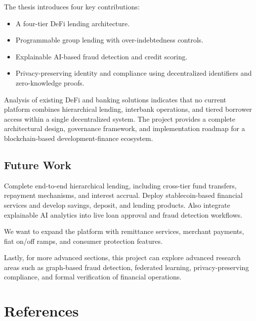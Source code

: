 \documentclass[12pt, a4paper]{report}
\begin{document}
The thesis introduces four key contributions:
\begin{itemize}[noitemsep]
\item A four-tier DeFi lending architecture.
\item Programmable group lending with over-indebtedness controls.
\item Explainable AI-based fraud detection and credit scoring.
\item Privacy-preserving identity and compliance using decentralized identifiers and zero-knowledge proofs.
\end{itemize}

Analysis of existing DeFi and banking solutions indicates that no current platform combines hierarchical lending, interbank operations, and tiered borrower access within a single decentralized system. The project provides a complete architectural design, governance framework, and implementation roadmap for a blockchain-based development-finance ecosystem.

\section{Future Work}

Complete end-to-end hierarchical lending, including cross-tier fund transfers, repayment mechanisms, and interest accrual. Deploy stablecoin-based financial services and develop savings, deposit, and lending products. Also integrate explainable AI analytics into live loan approval and fraud detection workflows.

We want to expand the platform with remittance services, merchant payments, fiat on/off ramps, and consumer protection features.

Lastly, for more advanced sections, this project can explore advanced research areas such as graph-based fraud detection, federated learning, privacy-preserving compliance, and formal verification of financial operations.

\chapter*{References}
{}
\end{document}
